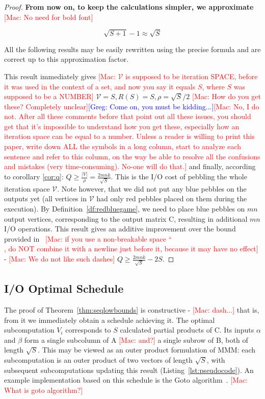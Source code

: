 \documentclass[sigplan,review,anonymous]{acmart}\settopmatter{printfolios=true,printccs=false,printacmref=false}
\newcommand\greg[1]{\textcolor{blue}{[Greg: #1]}}
\newcommand\mac[1]{\textcolor{red}{[Mac: #1]}}
\begin{document}
\begin{proof}
 
\textbf{From now on, to keep the calculations simpler, we approximate} 
\mac{No need for bold font}

\begin{equation}
\label{eq:approx}
\sqrt{S + 1} - 1 \approx \sqrt{S}
\end{equation}

All the following results may be easily rewritten using the precise formula and
are correct up to this approximation factor.

This result immediately gives \mac{$\mathcal{V}$ is supposed to be iteration
SPACE, before it was used in the context of a set, and now you say it equals
$S$, where $S$ was supposed to be a NUMBER} $\mathcal{V} = S, R(S) = S, \rho =
\sqrt{S}/2$ \mac{How do you get these? Completely unclear}\greg{Come on, you
must be kidding...}\mac{No, I do not. After all these comments before that
point out all these issues, you should get that it's impossible to understand
how you get these, especially how an iteration space can be equal to a number.
Unless a reader is willing to print this paper, write down ALL the symbols in a
long column, start to analyze each sentence and refer to this column, on the
way be able to resolve all the confusions and mistakes (very time-consuming).
No-one will do that.} and finally, according to corollary \ref{cor:q}:  $Q \ge
\frac{|V|}{\rho} = \frac{2mnk}{\sqrt{S}}$.  This is the I/O cost of pebbling
the whole iteration space $\mathcal{V}$. Note however, that we did not put any
blue pebbles on the outputs yet (all vertices in $\mathcal{V}$ had only red
pebbles placed on them during the execution). By
Definition~\ref{df:redbluegame}, we need to place blue pebbles on $mn$ output
vertices, corresponding to the output matrix C, resulting in additional $mn$
I/O operations.  This result gives an additive improvement over the bound
provided in ~\mac{if you use a non-breakable space ``~\\, do NOT combine it
with a newline just before it, because it may have no effect}\cite{tightMMM} -
\mac{We do not like such dashes} $Q \ge \frac{2mnk}{\sqrt{S}} - 2S$.
%
\end{proof}
 
\subsection{I/O Optimal Schedule}

The proof of Theorem~\ref{thm:seqlowbounds} is constructive - \mac{dash...}
that is, from it we immediately obtain a schedule achieving it. The optimal
subcomputation $V_i$ corresponds to $S$ calculated partial products of C. Its
inputs $\alpha$ and $\beta$ form a single subcolumn of A \mac{and?} a single
subrow of B, both of length $\sqrt{S}$. This may be viewed as an outer product
formulation of MMM: each subcomputation is an outer product of two vectors of
length $\sqrt{S}$, with subsequent subcomputations updating this result
(Listing~\ref{lst:pseudocode}). An example implementation based on this
schedule is the Goto algorithm~\cite{Goto}. \mac{What is goto algorithm?}
\end{document}
